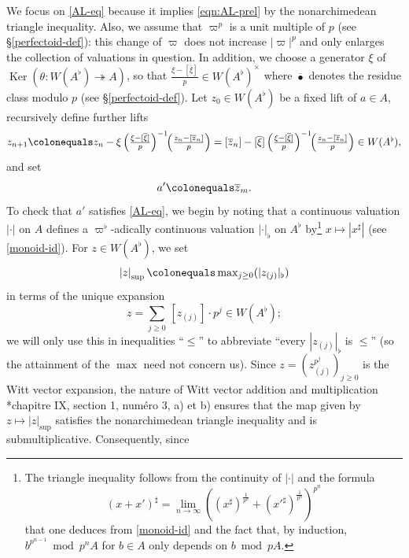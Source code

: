 \documentclass[11pt, reqno]{amsart}
\DeclareMathOperator{\Ker}{Ker}		%
\newcommand{\ce}{\colonequals}
\renewcommand{\i}{^{-1}}
\newcommand{\ov}{\overline}
\providecommand{\p}[1]{\left(#1\right)}
\newcommand{\ra}{\rightarrow}
\newcommand{\surjects}{\twoheadrightarrow}
\newcommand{\wt}{\widetilde}
\providecommand{\abs}[1]{\left\lvert#1\right\rvert}
\providecommand{\f}[2]{\frac{#1}{#2}}
\newcommand{\x}{\text}
\newcommand{\q}{\quad}
\newcommand{\tst}{\textstyle}
\numberwithin{equation}{numberingbase}
\theoremstyle{thms}
\theoremstyle{claims}
\theoremstyle{defs}
\theoremstyle{thms}
\theoremstyle{defs}
\theoremstyle{subsection-tweak}
\theoremstyle{subsection-tweak}
\begin{document}
We focus on \eqref{AL-eq} because it implies \eqref{eqn:AL-prel} by the nonarchimedean triangle inequality. Also, we assume that $\varpi^p$ is a unit multiple of $p$ (see \S\ref{perfectoid-def}): this change of $\varpi$ does not increase $\abs{\varpi}^p$ and only enlarges the collection of valuations in question. In addition, we %
choose a generator $\xi$ of $\Ker(\theta \colon W(A^\flat) \surjects A)$, so that %
$\f{\xi - [\ov{\xi}]}{p} \in W(A^\flat)^\times$ where $\ov{\bullet}$ denotes the residue class modulo $p$ (see \S\ref{perfectoid-def}). Let $z_0 \in W(A^\flat)$ be a fixed lift of $a \in A$, %
recursively define further lifts
\[
\tst z_{n + 1} \ce z_n - \xi  \p{\f{\xi - [\ov{\xi}]}{p}}\i \!\! \p{\f{z_n - [\ov{z}_n]}{p}} = [\ov{z}_n] - [\ov{\xi}] \p{\f{\xi - [\ov{\xi}]}{p}}\i\!\! \p{\f{z_n - [\ov{z}_n]}{p}} \in W(A^\flat), 
\]
and set 
\[
a' \ce \ov{z}_m.
\]
To check that $a'$ satisfies \eqref{AL-eq}, we begin by noting that a continuous valuation $\abs{\cdot}$ on $A$ defines a $\varpi^\flat$-adically continuous valuation $\abs{\cdot}_{\flat}$ on $A^\flat$ by\footnote{The triangle inequality follows from the continuity of $\abs{\cdot}$ and the formula 
\[
(x + x')^\sharp = \lim_{n \ra \infty} ((x^\sharp)^{\frac{1}{p^n}} + (x'^\sharp)^{\frac{1}{p^n}})^{p^n}
\]
that one deduces from \eqref{monoid-id} and the fact that, by induction, $b^{p^{n - 1}} \bmod p^nA$ for $b \in A$ only depends on $b \bmod pA$.} $x \mapsto \abs{x^\sharp}$ (see \eqref{monoid-id}). For $z \in W(A^\flat)$, we set 
\[
\tst \abs{z}_{\sup} \ce \max_{j \ge 0} (|z_{(j)}|_\flat) 
\]
in terms of the unique expansion
\[
\tst  z = \sum_{j \ge 0}\, [z_{(j)}]\cdot p^j \in W(A^\flat);
\]
we will only use this in inequalities ``$\le$'' to abbreviate ``every $|z_{(j)}|_\flat$ is $\le$'' (so the attainment of the $\max$ need not concern us). Since $z = (z_{(j)}^{p^j})_{j \ge 0}$ is the Witt vector expansion, the nature of Witt vector addition and multiplication  \cite{BouAC}*{chapitre IX, section 1, num\'{e}ro 3, a) et b)} ensures that the map given by $z \mapsto \abs{z}_{\sup}$ satisfies the nonarchimedean triangle inequality and  is submultiplicative.  Consequently, since
\end{document}
